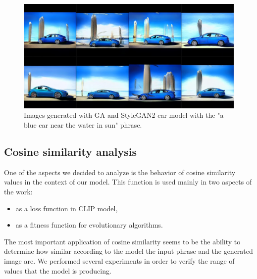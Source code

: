 \documentclass[11pt,a4paper,openany]{book}
\begin{document}
\begin{figure}[H]
    \centering
    \includegraphics[scale=0.6]{figs/bluecar.png}
    \caption{Images generated with GA and StyleGAN2-car model with the "a blue car near the water in sun" phrase.}\label{Fig:bluecar}
\end{figure}

\subsection*{Cosine similarity analysis}
\noindent One of the aspects we decided to analyze is the behavior of cosine similarity values in the context of our model. This function is used mainly in two aspects of the work:
\begin{itemize}
\item  as a loss function in CLIP model,
\item as a fitness function for evolutionary algorithms.
\end{itemize}
\noindent The most important application of cosine similarity seems to be the ability to determine how similar according to the model the input phrase and the generated image are.  We performed several experiments in order to verify the range of values that the model is producing.
\newline
\end{document}
